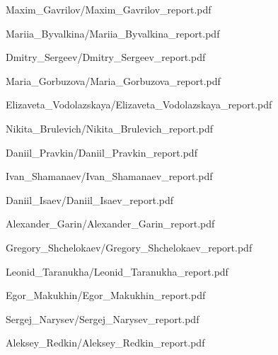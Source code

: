 \documentclass[a4paper]{article}
\begin{document}
{Maxim_Gavrilov/Maxim_Gavrilov_report.pdf}

{Mariia_Byvalkina/Mariia_Byvalkina_report.pdf}

{Dmitry_Sergeev/Dmitry_Sergeev_report.pdf}

{Maria_Gorbuzova/Maria_Gorbuzova_report.pdf}

{Elizaveta_Vodolazskaya/Elizaveta_Vodolazskaya_report.pdf}

{Nikita_Brulevich/Nikita_Brulevich_report.pdf}

{Daniil_Pravkin/Daniil_Pravkin_report.pdf}

{Ivan_Shamanaev/Ivan_Shamanaev_report.pdf}

{Daniil_Isaev/Daniil_Isaev_report.pdf}

{Alexander_Garin/Alexander_Garin_report.pdf}

{Gregory_Shchelokaev/Gregory_Shchelokaev_report.pdf}

{Leonid_Taranukha/Leonid_Taranukha_report.pdf}

{Egor_Makukhin/Egor_Makukhin_report.pdf}

{Sergej_Narysev/Sergej_Narysev_report.pdf}

{Aleksey_Redkin/Aleksey_Redkin_report.pdf}
\end{document}
